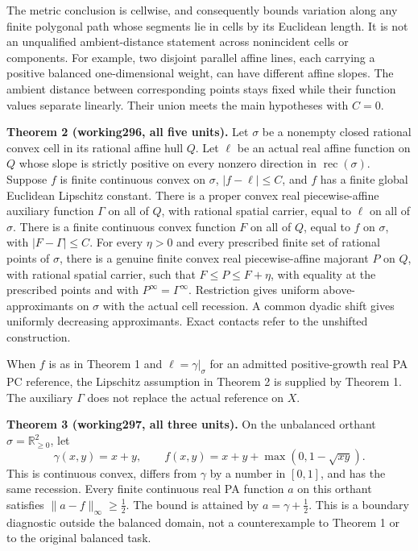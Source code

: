 \documentclass[
  11pt,
]{article}
\begin{document}
The metric conclusion is cellwise, and consequently bounds variation
along any finite polygonal path whose segments lie in cells by its
Euclidean length. It is not an unqualified ambient-distance statement
across nonincident cells or components. For example, two disjoint
parallel affine lines, each carrying a positive balanced one-dimensional
weight, can have different affine slopes. The ambient distance between
corresponding points stays fixed while their function values separate
linearly. Their union meets the main hypotheses with \(C=0\).

\textbf{Theorem 2 (working296, all five units).} Let \(\sigma\) be a
nonempty closed rational convex cell in its rational affine hull \(Q\).
Let \(\ell\) be an actual real affine function on \(Q\) whose slope is
strictly positive on every nonzero direction in
\(\operatorname{rec}(\sigma)\). Suppose \(f\) is finite continuous
convex on \(\sigma\), \(|f-\ell|\leq C\), and \(f\) has a finite global
Euclidean Lipschitz constant. There is a proper convex real
piecewise-affine auxiliary function \(\Gamma\) on all of \(Q\), with
rational spatial carrier, equal to \(\ell\) on all of \(\sigma\). There
is a finite continuous convex function \(F\) on all of \(Q\), equal to
\(f\) on \(\sigma\), with \(|F-\Gamma|\leq C\). For every \(\eta>0\) and
every prescribed finite set of rational points of \(\sigma\), there is a
genuine finite convex real piecewise-affine majorant \(P\) on \(Q\),
with rational spatial carrier, such that \(F\leq P\leq F+\eta\), with
equality at the prescribed points and with \(P^\infty=\Gamma^\infty\).
Restriction gives uniform above-approximants on \(\sigma\) with the
actual cell recession. A common dyadic shift gives uniformly decreasing
approximants. Exact contacts refer to the unshifted construction.

When \(f\) is as in Theorem 1 and \(\ell=\gamma|_\sigma\) for an
admitted positive-growth real PA PC reference, the Lipschitz assumption
in Theorem 2 is supplied by Theorem 1. The auxiliary \(\Gamma\) does not
replace the actual reference on \(X\).

\textbf{Theorem 3 (working297, all three units).} On the unbalanced
orthant \(\sigma=\mathbb R_{\geq0}^2\), let \[
\gamma(x,y)=x+y,
\qquad f(x,y)=x+y+\max(0,1-\sqrt{xy}).
\] This is continuous convex, differs from \(\gamma\) by a number in
\([0,1]\), and has the same recession. Every finite continuous real PA
function \(a\) on this orthant satisfies \(\|a-f\|_\infty\geq\tfrac12\).
The bound is attained by \(a=\gamma+\tfrac12\). This is a boundary
diagnostic outside the balanced domain, not a counterexample to Theorem
1 or to the original balanced task.
\end{document}
